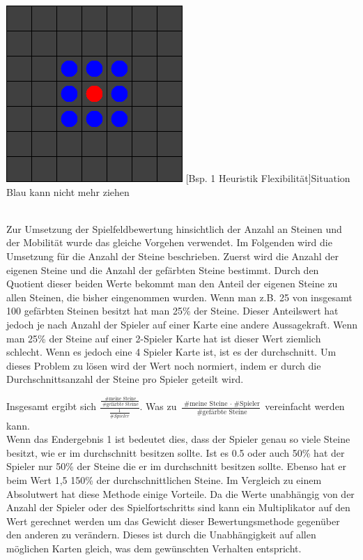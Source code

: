\documentclass[12pt,a4paper,bibliography=totocnumbered,listof=totocnumbered]{article}
\begin{document}
\vspace{1em}
\begin{minipage}{\linewidth}
	\centering
	\includegraphics[width=0.3\linewidth]{pics/heuristics_flexibility_simple.png}
	[Bsp. 1 Heuristik Flexibilität]{Situation Blau kann nicht mehr ziehen}
	\label{fig:example_heuristics_flexibility_simple}
\end{minipage}
\\


Zur Umsetzung der Spielfeldbewertung hinsichtlich der Anzahl an Steinen und der Mobilität wurde das gleiche Vorgehen verwendet. Im Folgenden wird die Umsetzung für die Anzahl der Steine beschrieben.
Zuerst wird die Anzahl der eigenen Steine und die Anzahl der gefärbten Steine bestimmt. Durch den Quotient dieser beiden Werte bekommt man den Anteil der eigenen Steine zu allen Steinen, die bisher eingenommen wurden. Wenn man z.B. 25 von insgesamt 100 gefärbten Steinen besitzt hat man 25\% der Steine. Dieser Anteilswert hat jedoch je nach Anzahl der Spieler auf einer Karte eine andere Aussagekraft. Wenn man 25\% der Steine auf einer 2-Spieler Karte hat ist dieser Wert ziemlich schlecht. Wenn es jedoch eine 4 Spieler Karte ist, ist es der durchschnitt. Um dieses Problem zu lösen wird der Wert noch normiert, indem er durch die Durchschnittsanzahl der Steine pro Spieler geteilt wird. 

Insgesamt ergibt sich
\( \frac{ \frac{\text{ \# meine Steine}}{\text{ \# gefärbte Steine}} }{ \frac{1}{ \# Spieler} } \).
Was zu
\( \frac{ \text{ \# meine Steine } \cdot \text{ \# Spieler} }{ \text{ \# gefärbte Steine} } \) 
vereinfacht werden kann.\\
Wenn das Endergebnis 1 ist bedeutet dies, dass der Spieler genau so viele Steine besitzt, wie er im durchschnitt besitzen sollte. Ist es 0.5 oder auch 50\% hat der Spieler nur 50\% der Steine die er im durchschnitt besitzen sollte. Ebenso hat er beim Wert 1,5 150\% der durchschnittlichen Steine.
Im Vergleich zu einem Absolutwert hat diese Methode einige Vorteile. Da die Werte unabhängig von der Anzahl der Spieler oder des Spielfortschritts sind  kann ein Multiplikator auf den Wert gerechnet werden um das Gewicht dieser Bewertungsmethode gegenüber den anderen zu verändern. Dieses ist durch die Unabhängigkeit auf allen möglichen Karten gleich, was dem gewünschten Verhalten entspricht.
\end{document}
